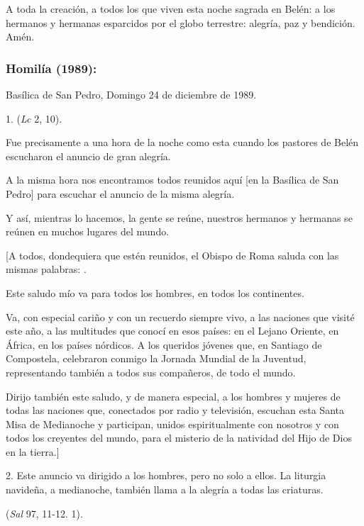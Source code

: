 \begin{body}
\begin{body}
		A toda la creación, a todos los que viven esta noche sagrada en Belén: a los hermanos y hermanas esparcidos por el globo terrestre: alegría, paz y bendición. Amén.
	\end{body}

	\subsubsection{Homilía (1989):}

	Basílica de San Pedro, Domingo 24 de diciembre de 1989.

	\begin{body}
		1.  (\emph{Lc} 2, 10).

		Fue precisamente a una hora de la noche como esta cuando los pastores de Belén escucharon el anuncio de gran alegría.

		A la misma hora nos encontramos todos reunidos aquí {[}en la Basílica de San Pedro{]} para escuchar el anuncio de la misma alegría.

		Y así, mientras lo hacemos, la gente se reúne, nuestros hermanos y hermanas se reúnen en muchos lugares del mundo.

		{[}A todos, dondequiera que estén reunidos, el Obispo de Roma saluda con las mismas palabras: .

		Este saludo mío va para todos los hombres, en todos los continentes.

		Va, con especial cariño y con un recuerdo siempre vivo, a las naciones que visité este año, a las multitudes que conocí en esos países: en el Lejano Oriente, en África, en los países nórdicos. A los queridos jóvenes que, en Santiago de Compostela, celebraron conmigo la Jornada Mundial de la Juventud, representando también a todos sus compañeros, de todo el mundo.

		Dirijo también este saludo, y de manera especial, a los hombres y mujeres de todas las naciones que, conectados por radio y televisión, escuchan esta Santa Misa de Medianoche y participan, unidos espiritualmente con nosotros y con todos los creyentes del mundo, para el misterio de la natividad del Hijo de Dios en la tierra.{]}

		2. Este anuncio va dirigido a los hombres, pero no solo a ellos. La liturgia navideña, a medianoche, también llama a la alegría a todas las criaturas.

		 (\emph{Sal} 97, 11-12. 1).


\end{body}
\end{body}
